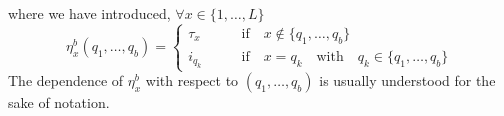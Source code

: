 \documentclass[10pt]{article}
\numberwithin{equation}{section}
\numberwithin{equation}{subsection}
\begin{document}
where we have introduced, $\forall x\in \{1,\ldots,L\}$
\begin{equation}\label{eta-notation}
	\eta_{x}^{b}(q_{1},\ldots,q_{b})=\begin{cases}
		\tau_{x}\qquad &\text{if}\quad x\notin \{q_{1},\ldots,q_{b}\}\\
		i_{q_{k}}\qquad &\text{if}\quad x=q_{k}\quad \text{with}\quad q_{k}\in\{q_{1},\ldots,q_{b}\}
	\end{cases}%
	\end{equation}
	The dependence of $\eta_{x}^{b}$ with respect to $(q_{1},\ldots,q_{b})$ is usually understood for the sake of notation. 
\begin{comment}
	{\color{blue}
		\begin{equation}\label{steadyStateH-coeff}
			\begin{split}
				\Psi(\bm{\tau})&=\sum_{c_{1}=0}^{1-\delta_{\tau_{1},N}}\ldots\sum_{c_{L}=0}^{1-\delta_{\tau_{L},N}}\frac{\Gamma(2+L-\sum_{z=1}^{L}c_{z})}{\Gamma(L+2)}\prod_{y=1}^{L}\left(\lambda_{\tau_{y}}\left(2+L-y-\sum_{j=y}^{L}c_{j}\right)\right)^{c_{y}}\beta_{\tau_{y}}^{(1-c_{y})(1-\delta_{\tau_{y},N})}
				\\&+
				\sum_{b=1}^{L}(-1)^{b}\sum_{q_{1}=1}^{L}\sum_{q_{2}=q_{1}+1}^{L}\ldots\sum_{q_{b}=q_{b-1}+1}^{L}\left(\prod_{s=1}^{b}\delta_{s_{q_{r}},N}\right) 
				\sum_{d_{q_{1}}=2}^{N}\ldots\sum_{d_{q_{b}}=2}^{N}
				\\&
				\sum_{x=1\,:\, x\neq q_{1},\ldots,q_{b}}^{L}\sum_{c_{x}=0}^{1-\delta_{\tau_{x},N}}\sum_{c_{q_{1}}=1}^{1}\ldots\sum_{c_{q_{b}}=0}^{1}\frac{\Gamma(2+L-\sum_{z=1}^{L}c_{z})}{\Gamma(2+L)}
				\prod_{y=1\,:\, y\neq q_{1},\ldots,q_{b}}^{L}\left(\lambda_{\tau_{y}}\left(2+L-y-\sum_{j=y}^{L}c_{j}\right)\right)^{c_{y}}
				\\ &
				\beta_{\tau_{y}}^{(1-c_{y})(1-\delta_{\tau_{y},N})}
				\prod_{t=1}^{b}\lambda_{d_{q_{t}}}\left(2+L-q_{t}-\sum_{j=q_{t}}^{L}c_{j}\right)^{c_{q_{t}}}\beta_{d_{q_{t}}}^{(1-c_{q_{t}})}
			\end{split}
		\end{equation}
	}
\end{comment}
	
\end{document}
